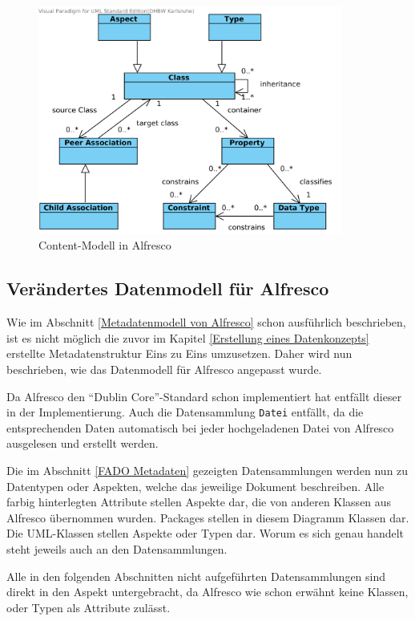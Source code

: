 \begin{figure}[!ht]
\centering
\includegraphics[width=10cm]{Bilder/Alfresco_Contentmodel.png}
\caption{Content-Modell in Alfresco}
\label{Alfresco Content-Modell}
\centering
\end{figure}

\subsection{Ver\"andertes Datenmodell f\"ur Alfresco}\label{Ver\"andertes Datenmodell f\"ur Alfresco}
Wie im Abschnitt \ref{Metadatenmodell von Alfresco} schon ausf\"uhrlich beschrieben, ist es nicht m\"oglich die zuvor im Kapitel \ref{Erstellung eines Datenkonzepts} erstellte Metadatenstruktur Eins zu Eins umzusetzen. Daher wird nun beschrieben, wie das Datenmodell f\"ur Alfresco angepasst wurde.

Da Alfresco den "`Dublin Core"'-Standard schon implementiert hat entf\"allt dieser in der Implementierung. Auch die Datensammlung \texttt{Datei} entf\"allt, da die entsprechenden Daten automatisch bei jeder hochgeladenen Datei von Alfresco ausgelesen und erstellt werden. 

Die im Abschnitt \ref{FADO Metadaten} gezeigten Datensammlungen werden nun zu Datentypen oder Aspekten, welche das jeweilige Dokument beschreiben. Alle farbig hinterlegten Attribute stellen Aspekte dar, die von anderen Klassen aus Alfresco \"ubernommen wurden.
Packages stellen in diesem Diagramm Klassen dar. Die UML-Klassen stellen Aspekte oder Typen dar. Worum es sich genau handelt steht jeweils auch an den Datensammlungen. 

Alle in den folgenden Abschnitten nicht aufgef\"uhrten Datensammlungen sind direkt in den Aspekt  untergebracht, da Alfresco wie schon erw\"ahnt keine Klassen, oder Typen als Attribute zul\"asst.

